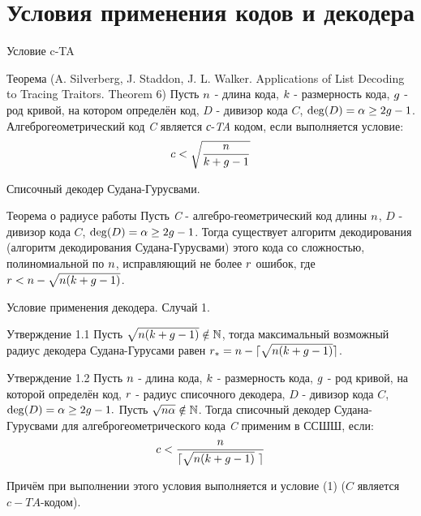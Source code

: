\documentclass{beamer}
\begin{document}
\section {Условия применения кодов и декодера}

\begin {frame}
\tableofcontents[currentsection]
\end {frame}

\begin {frame} {Условие c-TA}
\begin {block} {Теорема (A. Silverberg, J. Staddon, J. L. Walker. Applications of List Decoding to Tracing Traitors. Theorem 6)}
Пусть ${\sl n}$  - длина кода,  ${\sl k}$  - размерность кода, ${\sl g}$ - род кривой, на котором определён код, $D$ - дивизор кода $C$, ${\rm deg}(D) = \alpha \ge 2g - 1$.
Алгеброгеометрический код {\sl C} является {\sl с}-{\sl TA} кодом, если выполняется условие:
\begin {equation}
{\sl c} < \sqrt {\frac {\sl n}{k+g-1}}
\end {equation}
\end {block}
\end {frame}

\begin {frame} {Списочный декодер Судана-Гурусвами.}
\begin {block} {Теорема о радиусе работы}
Пусть {\sl C} - алгебро-геометрический код длины ${\sl n}$, $D$ - дивизор кода $C$, ${\rm deg}(D) = \alpha \ge 2g-1$. Тогда существует алгоритм декодирования (алгоритм декодирования Судана-Гурусвами) этого кода со сложностью, полиномиальной по ${\sl n}$, исправляющий не более ${\sl r}$ ошибок, где $r < {\sl n} - \sqrt { {\sl n} (k+g-1) }$.
\end {block}
\end {frame}

\begin {frame} {Условие применения декодера. Случай 1.}
\begin {block} {Утверждение 1.1}
Пусть $\sqrt { {\sl n} (k+g-1) } \notin {\mathbb N}$, тогда максимальный возможный радиус декодера Судана-Гурусами равен ${\sl r_*}  =  {\sl n} - \lceil \sqrt { {\sl n} (k+g-1) } \rceil$.
\end {block}

\begin {block} {Утверждение 1.2}
Пусть ${\sl n}$  - длина кода,  ${\sl k}$  - размерность кода, ${\sl g}$ - род кривой, на которой определён код, ${\sl r}$ - радиус списочного декодера, $D$ - дивизор кода $C$, ${\rm deg}(D) = \alpha \ge 2g - 1.$ Пусть $\sqrt { {\sl n}\alpha } \notin {\mathbb N}$.
Тогда списочный декодер Судана-Гурусвами для алгеброгеометрического кода {\sl C} применим в ССШШ, если:
\begin{equation}
 {\sl c} < \frac {\sl n}{\lceil \sqrt {{\sl n} (k+g-1)} \ \rceil}
\end {equation}

Причём при выполнении этого условия выполняется и условие (1) ($C$ является $c-TA$-кодом).
\end {block}
\end {frame}
\end{document}
